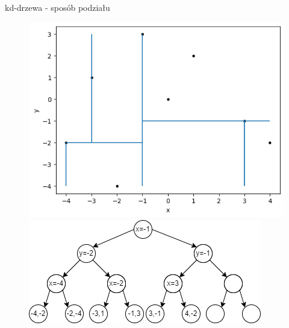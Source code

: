 \documentclass[aspectratio=169,dvipsnames]{beamer}
\begin{document}
\begin{frame}{kd-drzewa - sposób podziału}
    \begin{figure}[H]
        \centering
          \begin{minipage}{0.5\textwidth}
            \centering
            \includegraphics[width=\linewidth]{images/plots/7.png}
          \end{minipage}%
          \begin{minipage}{0.5\textwidth}
            \centering
            \includegraphics[width=\linewidth]{images/trees/10.drawio.png}
          \end{minipage}
    \end{figure}
\end{frame}
\end{document}
